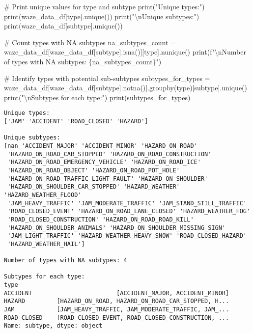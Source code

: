 \documentclass[
  letterpaper,
  DIV=11,
  numbers=noendperiod]{scrartcl}
\newenvironment{Shaded}{\begin{snugshade}}{\end{snugshade}}
\newcommand{\BuiltInTok}[1]{\textcolor[rgb]{0.00,0.23,0.31}{#1}}
\newcommand{\CharTok}[1]{\textcolor[rgb]{0.13,0.47,0.30}{#1}}
\newcommand{\CommentTok}[1]{\textcolor[rgb]{0.37,0.37,0.37}{#1}}
\newcommand{\NormalTok}[1]{\textcolor[rgb]{0.00,0.23,0.31}{#1}}
\newcommand{\OperatorTok}[1]{\textcolor[rgb]{0.37,0.37,0.37}{#1}}
\newcommand{\SpecialCharTok}[1]{\textcolor[rgb]{0.37,0.37,0.37}{#1}}
\newcommand{\SpecialStringTok}[1]{\textcolor[rgb]{0.13,0.47,0.30}{#1}}
\newcommand{\StringTok}[1]{\textcolor[rgb]{0.13,0.47,0.30}{#1}}
\begin{document}
\begin{Shaded}
\begin{Highlighting}[]
\CommentTok{\# Print unique values for type and subtype}
\BuiltInTok{print}\NormalTok{(}\StringTok{"Unique types:"}\NormalTok{)}
\BuiltInTok{print}\NormalTok{(waze\_data\_df[}\StringTok{\textquotesingle{}type\textquotesingle{}}\NormalTok{].unique())}
\BuiltInTok{print}\NormalTok{(}\StringTok{"}\CharTok{\textbackslash{}n}\StringTok{Unique subtypes:"}\NormalTok{)}
\BuiltInTok{print}\NormalTok{(waze\_data\_df[}\StringTok{\textquotesingle{}subtype\textquotesingle{}}\NormalTok{].unique())}

\CommentTok{\# Count types with NA subtypes}
\NormalTok{na\_subtypes\_count }\OperatorTok{=}\NormalTok{ waze\_data\_df[waze\_data\_df[}\StringTok{\textquotesingle{}subtype\textquotesingle{}}\NormalTok{].isna()][}\StringTok{\textquotesingle{}type\textquotesingle{}}\NormalTok{].nunique()}
\BuiltInTok{print}\NormalTok{(}\SpecialStringTok{f"}\CharTok{\textbackslash{}n}\SpecialStringTok{Number of types with NA subtypes: }\SpecialCharTok{\{}\NormalTok{na\_subtypes\_count}\SpecialCharTok{\}}\SpecialStringTok{"}\NormalTok{)}

\CommentTok{\# Identify types with potential sub{-}subtypes}
\NormalTok{subtypes\_for\_types }\OperatorTok{=}\NormalTok{ waze\_data\_df[waze\_data\_df[}\StringTok{\textquotesingle{}subtype\textquotesingle{}}\NormalTok{].notna()].groupby(}\StringTok{\textquotesingle{}type\textquotesingle{}}\NormalTok{)[}\StringTok{\textquotesingle{}subtype\textquotesingle{}}\NormalTok{].unique()}
\BuiltInTok{print}\NormalTok{(}\StringTok{"}\CharTok{\textbackslash{}n}\StringTok{Subtypes for each type:"}\NormalTok{)}
\BuiltInTok{print}\NormalTok{(subtypes\_for\_types)}
\end{Highlighting}
\end{Shaded}

\begin{verbatim}
Unique types:
['JAM' 'ACCIDENT' 'ROAD_CLOSED' 'HAZARD']

Unique subtypes:
[nan 'ACCIDENT_MAJOR' 'ACCIDENT_MINOR' 'HAZARD_ON_ROAD'
 'HAZARD_ON_ROAD_CAR_STOPPED' 'HAZARD_ON_ROAD_CONSTRUCTION'
 'HAZARD_ON_ROAD_EMERGENCY_VEHICLE' 'HAZARD_ON_ROAD_ICE'
 'HAZARD_ON_ROAD_OBJECT' 'HAZARD_ON_ROAD_POT_HOLE'
 'HAZARD_ON_ROAD_TRAFFIC_LIGHT_FAULT' 'HAZARD_ON_SHOULDER'
 'HAZARD_ON_SHOULDER_CAR_STOPPED' 'HAZARD_WEATHER' 'HAZARD_WEATHER_FLOOD'
 'JAM_HEAVY_TRAFFIC' 'JAM_MODERATE_TRAFFIC' 'JAM_STAND_STILL_TRAFFIC'
 'ROAD_CLOSED_EVENT' 'HAZARD_ON_ROAD_LANE_CLOSED' 'HAZARD_WEATHER_FOG'
 'ROAD_CLOSED_CONSTRUCTION' 'HAZARD_ON_ROAD_ROAD_KILL'
 'HAZARD_ON_SHOULDER_ANIMALS' 'HAZARD_ON_SHOULDER_MISSING_SIGN'
 'JAM_LIGHT_TRAFFIC' 'HAZARD_WEATHER_HEAVY_SNOW' 'ROAD_CLOSED_HAZARD'
 'HAZARD_WEATHER_HAIL']

Number of types with NA subtypes: 4

Subtypes for each type:
type
ACCIDENT                        [ACCIDENT_MAJOR, ACCIDENT_MINOR]
HAZARD         [HAZARD_ON_ROAD, HAZARD_ON_ROAD_CAR_STOPPED, H...
JAM            [JAM_HEAVY_TRAFFIC, JAM_MODERATE_TRAFFIC, JAM_...
ROAD_CLOSED    [ROAD_CLOSED_EVENT, ROAD_CLOSED_CONSTRUCTION, ...
Name: subtype, dtype: object
\end{verbatim}
\end{document}
